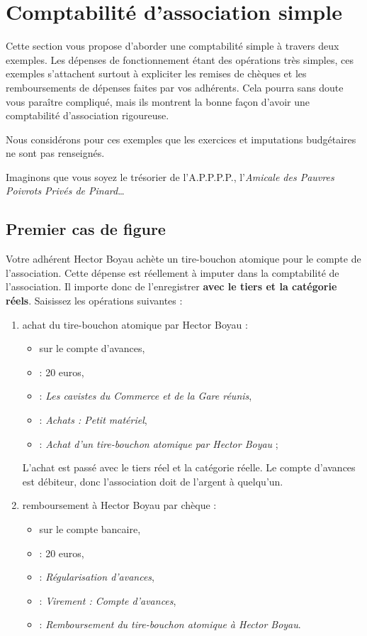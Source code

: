 \section{Comptabilité d'association simple\label{asso-simple}}


Cette section vous propose d'aborder une comptabilité simple à travers deux exemples. Les dépenses de fonctionnement étant des opérations très simples, ces exemples s'attachent surtout à expliciter les remises de chèques et les remboursements de dépenses faites par vos adhérents. Cela pourra sans doute vous paraître compliqué, mais ils montrent la bonne façon d'avoir une comptabilité d'association rigoureuse. 

Nous considérons pour ces exemples que les exercices et imputations budgétaires ne sont pas renseignés. 

Imaginons que vous soyez le trésorier de l'A.P.P.P.P., l'\emph{Amicale
des Pauvres Poivrots Privés de Pinard}\ldots


\subsection{Premier cas de figure\label{asso-simple-firstCase}}

Votre adhérent Hector Boyau achète un tire-bouchon atomique pour le compte de l'association. Cette dépense est réellement à imputer dans la comptabilité de l'association. Il importe donc de l'enregistrer \textbf{avec le tiers et la catégorie réels}. Saisissez les opérations suivantes :

\begin{enumerate}
	\item achat du tire-bouchon atomique par Hector Boyau :
		\begin{itemize}
			\item sur le compte d'avances,
			\item {} : 20 euros,
			\item {} : \emph{Les cavistes du Commerce et de la Gare réunis},
			\item {} : \emph{Achats : Petit matériel},
			\item {} : \emph{Achat d'un tire-bouchon atomique par Hector Boyau} ; 
		\end{itemize}
L'achat est passé avec le tiers réel et la catégorie réelle. Le compte d'avances est débiteur, donc l'association doit de l'argent à quelqu'un. 
	\item remboursement à Hector Boyau par chèque :
		\begin{itemize}
			\item sur le compte bancaire,
			\item {} : 20 euros,
			\item {} : \emph{Régularisation d'avances},
			\item {} : \emph{Virement : Compte d'avances},
			\item {} : \emph{Remboursement du tire-bouchon atomique à Hector Boyau}. 
		\end{itemize}
\end{enumerate}

